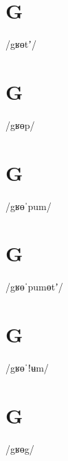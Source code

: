 \documentclass[10pt,a4paper,twoside]{book}
\begin{document}
\section*{G}

\begin{multicols}{3}
 {/gʁɵtʼ/} {}
\end{multicols}

\section*{G}

\begin{multicols}{3}
 {/gʁɵp/} {}
\end{multicols}

\section*{G}

\begin{multicols}{3}
 {/gʁɵˈpum/} {}
\end{multicols}

\section*{G}

\begin{multicols}{3}
 {/gʁɵˈpumɵtʼ/} {}
\end{multicols}

\section*{G}

\begin{multicols}{3}
 {/gʁɵˈǃʉm/} {}
\end{multicols}

\section*{G}

\begin{multicols}{3}
 {/gʁɵg/} {}
\end{multicols}
\end{document}
